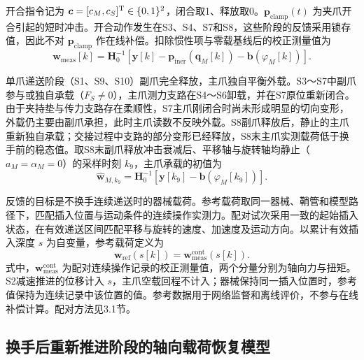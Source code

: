 \documentclass{JQR_LaTeX_Template-0507/JQRnew}
\begin{document}
开合指令记为 $\bm c=[c_M,c_S]^{\rm T}\in\{0,1\}^2$，闭合取1、释放取0。$\bm p_{\mathrm{clamp}}(t)$ 为夹爪开合引起的短时冲击。开合动作发生在S3、S4、S7和S8，这些阶段的反馈采用锁存值，因此不对 $\bm p_{\mathrm{clamp}}$ 作在线补偿。扣除惯性项与零载基线后的校正测量值为
\begin{equation}
\label{eq:corrected-measurement}
\bm w_{\mathrm{meas}}[k]=\bm H_0^{-1}\!\left[
\bm y[k]-\bm p_{\mathrm{iner}}(\bm q_M[k])-\bm b(\varphi_M[k])\right].
\end{equation}

单爪递送阶段（S1、S9、S10）副爪完全释放，主爪独自平衡外载。S3～S7中副爪参与或独自承载（$F_S\neq0$），主爪测力支路在S4～S6卸载，并在S7原位重新闭合。由于夹持垫与传力支路存在柔顺性，S7主爪刚闭合时尚未形成明显的切向变形，外载仍主要由副爪承担，此时主爪读数不反映外载。S8副爪释放后，静止的主爪重新独自承载；交接过程中支路的部分变形已经释放，S8末主爪实测载荷低于换手前的稳态值。取S8末副爪释放冲击衰减后、平移轴与旋转轴均静止（$a_M=\alpha_M=0$）的采样时刻 $k_9$，主爪承载的初值为
\begin{equation}
\label{eq:initial-load}
\widehat{\bm w}_{M,k_9}
=\bm H_0^{-1}\!\left[\bm y[k_9]-\bm b(\varphi_M[k_9])\right].
\end{equation}

反馈的目标是不换手连续递送时的器械载荷。参考载荷取同一器械、鞘管和模型路径下，匹配插入位置与运动条件的连续操作实测力。配对试次采用一致的起始插入状态，在有效递送区间匹配平移与旋转的速度、加速度及运动方向。以累计有效插入深度 $s$ 为自变量，参考载荷定义为
\begin{equation}
\label{eq:reference}
\bm w_{\mathrm{ref}}(s[k])
=\bm w_{\mathrm{meas}}^{\mathrm{cont}}(s[k]).
\end{equation}
式中，$\bm w_{\mathrm{meas}}^{\mathrm{cont}}$ 为配对连续操作记录的校正测量值，两个分量分别为轴向力与扭矩。S2减速推进的位移计入 $s$，主爪空载回程不计入；器械保持同一插入位置时，参考值保持为连续记录中该位置的值。参考数据用于网络监督和离线评价，不参与在线补偿计算。配对方法见3.1节。

\begin{figure}[H]
\centering
{}
\label{fig2}
\end{figure}

\subsection{换手后重新推进阶段的轴向载荷恢复模型}
\end{document}
